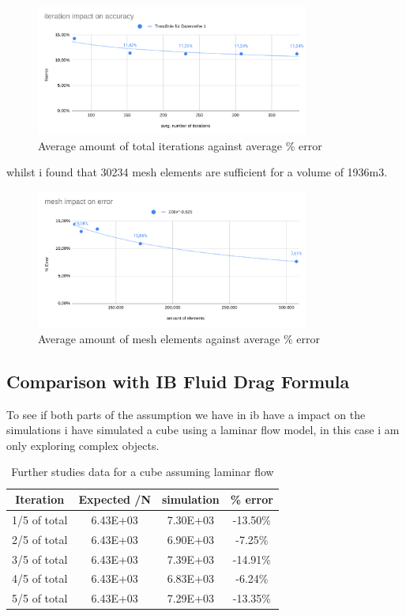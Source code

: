 \documentclass[12pt,a4paper]{article}
\begin{document}
\begin{figure}[H]
\centering
\includegraphics[width=0.8\textwidth]{image11.png}
\caption{Average amount of total iterations against average \% error}
\label{fig:iterations_final}
\end{figure}

whilst i found that 30234 mesh elements are sufficient for a volume of 1936m3.

\begin{figure}[H]
\centering
\includegraphics[width=0.8\textwidth]{image2.png}
\caption{Average amount of mesh elements against average \% error}
\label{fig:mesh_final}
\end{figure}

\subsection{Comparison with IB Fluid Drag Formula}

To see if both parts of the assumption we have in ib have a impact on the simulations i have simulated a cube using a laminar flow model, in this case i am only exploring complex objects. 

\begin{table}[H]
\centering
\caption{Further studies data for a cube assuming laminar flow}
\label{tab:laminar_cube}
\begin{tabular}{|c|c|c|c|}
\hline
\textbf{Iteration} & \textbf{Expected /N} & \textbf{simulation} & \textbf{\% error} \\
\hline
1/5 of total & 6.43E+03 & 7.30E+03 & -13.50\% \\
\hline
2/5 of total & 6.43E+03 & 6.90E+03 & -7.25\% \\
\hline
3/5 of total & 6.43E+03 & 7.39E+03 & -14.91\% \\
\hline
4/5 of total & 6.43E+03 & 6.83E+03 & -6.24\% \\
\hline
5/5 of total & 6.43E+03 & 7.29E+03 & -13.35\% \\
\hline
\end{tabular}
\end{table}
\end{document}
